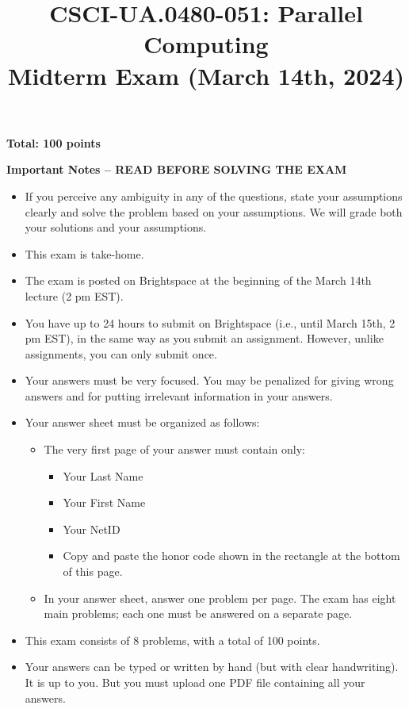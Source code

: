 \documentclass{article}
\title{CSCI-UA.0480-051: Parallel Computing \\ Midterm Exam (March 14th, 2024)}
\author{}
\date{}
\begin{document}
\maketitle

\textbf{Total: 100 points}

\textbf{Important Notes -- READ BEFORE SOLVING THE EXAM}

\begin{itemize}
    \item If you perceive any ambiguity in any of the questions, state your assumptions clearly and solve the problem based on your assumptions. We will grade both your solutions and your assumptions.
    \item This exam is take-home.
    \item The exam is posted on Brightspace at the beginning of the March 14th lecture (2 pm EST).
    \item You have up to 24 hours to submit on Brightspace (i.e., until March 15th, 2 pm EST), in the same way as you submit an assignment. However, unlike assignments, you can only submit once.
    \item Your answers must be very focused. You may be penalized for giving wrong answers and for putting irrelevant information in your answers.
    \item Your answer sheet must be organized as follows:
    \begin{itemize}
        \item The very first page of your answer must contain only:
        \begin{itemize}
            \item Your Last Name
            \item Your First Name
            \item Your NetID
            \item Copy and paste the honor code shown in the rectangle at the bottom of this page.
        \end{itemize}
        \item In your answer sheet, answer one problem per page. The exam has eight main problems; each one must be answered on a separate page.
    \end{itemize}
    \item This exam consists of 8 problems, with a total of 100 points.
    \item Your answers can be typed or written by hand (but with clear handwriting). It is up to you. But you must upload one PDF file containing all your answers.
\end{itemize}
\end{document}
